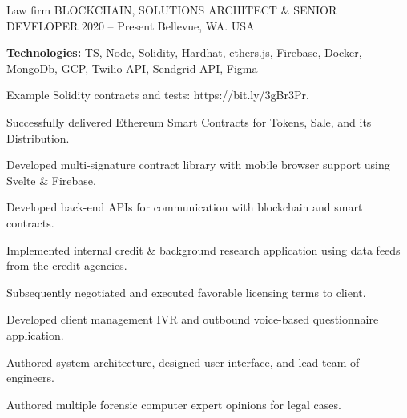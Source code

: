 \vspace{-2mm}
\begin{cventries}
  \cventry
    {Law firm} %
    {BLOCKCHAIN, SOLUTIONS ARCHITECT \& SENIOR DEVELOPER} %
    {2020 – Present} %
    {Bellevue, WA. USA} %
    {
      \begin{cvitems} %
        \item \textbf{Technologies:} TS, Node, Solidity, Hardhat, ethers.js, Firebase, Docker, MongoDb, GCP, Twilio API, Sendgrid API, Figma
        \item Example Solidity contracts and tests: https://bit.ly/3gBr3Pr.
        \item Successfully delivered Ethereum Smart Contracts for Tokens, Sale, and its Distribution.
        \item Developed multi-signature contract library with mobile browser support using Svelte \& Firebase.
        \item Developed back-end APIs for communication with blockchain and smart contracts. 
        \item Implemented internal credit \& background research application using data feeds from the credit agencies.
        \item Subsequently negotiated and executed favorable licensing terms to client.
        \item Developed client management IVR and outbound voice-based questionnaire application.
        \item Authored system architecture, designed user interface, and lead team of engineers.
        \item Authored multiple forensic computer expert opinions for legal cases.
      \end{cvitems}
    }


\end{cventries}
